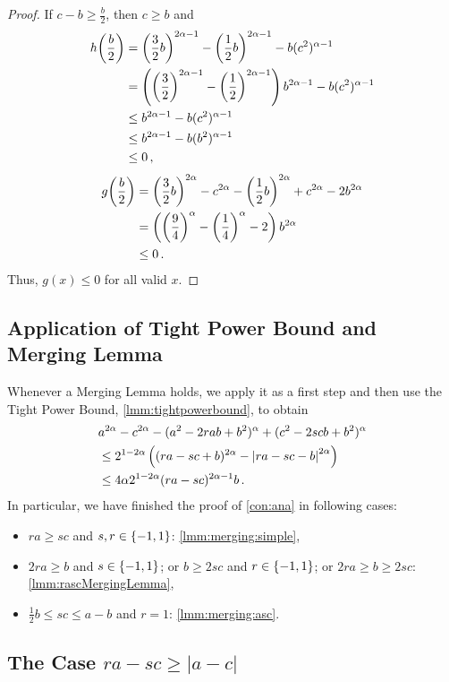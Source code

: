 \begin{proof}
	If $c-b\geq\frac b2$, then $c\geq b$ and
	\begin{align*}
		h\!\left( \frac b2 \right) 
		&= 
		\left( \frac32 b \right)^{2\alpha-1}-\left( \frac12 b \right)^{2\alpha-1}-b(c^2)^{\alpha -1}
		\\&=
		\left( \left( \frac32 \right)^{2\alpha-1}-\left( \frac12 \right)^{2\alpha-1} \right) b^{2\alpha-1}-b(c^2)^{\alpha -1}
		\\&\leq 
		b^{2\alpha-1}-b(c^2)^{\alpha -1}
		\\&\leq 
		b^{2\alpha-1}-b(b^2)^{\alpha -1}
		\\&\leq
		0\, ,
	\end{align*}
	\begin{align*}
		g\!\left( \frac b2 \right) 
		&=
		\left( \frac32b \right)^{2\alpha}-c^{2\alpha}-\left( \frac12b \right)^{2\alpha}+c^{2\alpha}
				- 2 b^{2\alpha} 
		\\&=
		\left( \left( \frac94 \right)^\alpha-\left( \frac14 \right)^\alpha-2 \right) b^{2\alpha}
		\\&\leq 
		0
		\, .
	\end{align*}
	Thus, $g(x)\leq 0$ for all valid $x$.
\end{proof}
%
%
%
%
\subsection{Application of Tight Power Bound and Merging Lemma} \label{ssec:apply}
%
Whenever a Merging Lemma holds, we apply it as a first step and then use the Tight Power Bound, \autoref{lmm:tightpowerbound}, to obtain
\begin{align*}
	&a^{2\alpha}-c^{2\alpha}-(a^2-2rab+b^2)^{\alpha} + (c^2 - 2 s c b + b^2)^\alpha 
	\\&\leq 
	2^{1-2\alpha} \left( (ra - s c + b)^{2\alpha}-\left| ra - s c - b \right|^{2\alpha} \right)
	\\& \leq 
	4\alpha 2^{1-2\alpha} (ra - s c)^{2\alpha-1} b
	\, .
\end{align*}	
In particular, we have finished the proof of \autoref{con:ana} in following cases:
\begin{itemize}
\item $ra\geq sc$ and $s, r \in \left\lbrace -1,1 \right\rbrace$: \autoref{lmm:merging:simple},
\item $2ra \geq b$ and $s\in\left\lbrace -1,1 \right\rbrace$; or $b \geq 2sc$ and $r\in\left\lbrace -1,1 \right\rbrace$; or  $2ra \geq b \geq 2sc$: \autoref{lmm:rascMergingLemma}, 
\item $\frac12 b \leq sc\leq a-b$ and $r=1$: \autoref{lmm:merging:asc}.
\end{itemize}
%
%
%
\subsection{The Case $ra-sc\geq |a-c|$} \label{ssec:rascgeqac}
%
